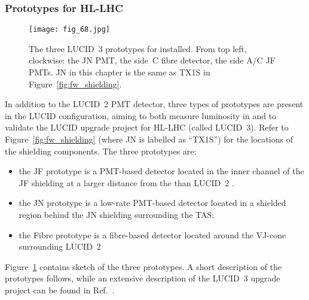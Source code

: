 \documentclass[cernpreprint, atlasdraft=false, UKenglish,british,orcidlogo, texmf, orcidlogo]{atlasdoc}
\begin{document}
\subsubsection{Prototypes for HL-LHC}
\begin{figure}[hbtp]
\centerline{\texttt{[image: fig\_68.jpg]}}
\caption{The three \gls{LUCID}~3 prototypes for \RunFour installed. From top left, clockwise: the JN \gls{PMT}, the side~C fibre detector, the side A/C JF \glspl{PMT}. JN in this chapter is the same as TX1S in Figure~\ref{fig:fw_shielding}.}
\label{fig:lucid_prototypes}
\end{figure}
In addition to the \gls{LUCID}~2 \gls{PMT} detector, three types of prototypes are present in the \gls{LUCID} \RunThr configuration, aiming to both measure luminosity in \RunThr
and to validate the \gls{LUCID} upgrade project for
\gls{HL-LHC} (called \gls{LUCID}~3).
Refer to Figure~\ref{fig:fw_shielding} (where JN is labelled as ``TX1S'') for the locations of the shielding components.
The three prototypes are:
\begin{itemize}
\item the JF prototype is a PMT-based detector located in the inner channel of the JF shielding at a larger distance from the \beampipe than \gls{LUCID}~2 .
\item the JN prototype is a low-rate PMT-based detector located in a shielded region behind the JN shielding surrounding the \gls{TAS};
\item the Fibre prototype is a fibre-based detector located around the VJ-cone
surrounding \gls{LUCID}~2
\end{itemize}
Figure~\ref{fig:lucid_prototypes} contains sketch of the three prototypes.
A short description of the prototypes follows, while an extensive description of
the \gls{LUCID}~3 upgrade project can be found in Ref.~\cite{LUCID-3_IDR}.
\end{document}
